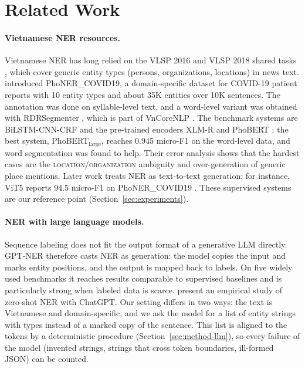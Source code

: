 
\section{Related Work}
\label{sec:related}

\paragraph{Vietnamese NER resources.}
Vietnamese NER has long relied on the VLSP 2016 and VLSP 2018 shared tasks
\citep{nguyen2016vlsp,nguyen2018vlsp}, which cover generic entity types
(persons, organizations, locations) in news text.
\citet{truong2021covid} introduced PhoNER\_COVID19, a domain-specific dataset for
COVID-19 patient reports with 10 entity types and about 35K entities over 10K sentences.
The annotation was done on syllable-level text, and a word-level variant was
obtained with RDRSegmenter \citep{nguyen2018rdr}, which is part of VnCoreNLP \citep{vu2018vncorenlp}.
The benchmark systems are BiLSTM-CNN-CRF \citep{ma2016endtoend} and the pre-trained
encoders XLM-R \citep{conneau2020xlmr} and PhoBERT \citep{nguyen2020phobert};
the best system, PhoBERT$_{\text{large}}$, reaches 0.945 micro-F1 on the word-level data, and word
segmentation was found to help.
Their error analysis shows that the hardest cases are the \textsc{location}/\textsc{organization}
ambiguity and over-generation of generic place mentions.
Later work treats NER as text-to-text generation; for instance, ViT5 reports
94.5 micro-F1 on PhoNER\_COVID19 \citep{phan2022vit5}.
These supervised systems are our reference point (Section~\ref{sec:experiments}).

\paragraph{NER with large language models.}
Sequence labeling does not fit the output format of a generative LLM directly.
GPT-NER \citep{wang2023gptner} therefore casts NER as generation: the model
copies the input and marks entity positions, and the output is mapped back to labels.
On five widely used benchmarks it reaches results comparable to supervised baselines and
is particularly strong when labeled data is scarce.
\citet{xie2023empirical} present an empirical study of zero-shot NER with ChatGPT.
Our setting differs in two ways: the text is Vietnamese and domain-specific, and we
ask the model for a list of entity strings with types instead of a marked copy of the sentence.
This list is aligned to the tokens by a deterministic procedure
(Section~\ref{sec:method-llm}), so every failure of the model (invented strings,
strings that cross token boundaries, ill-formed JSON) can be counted.

